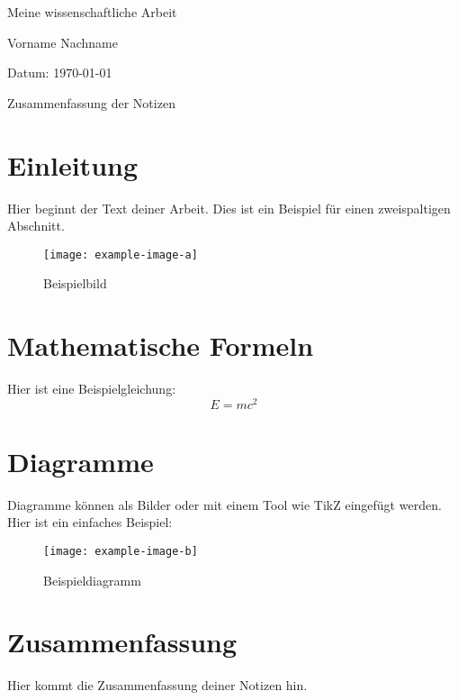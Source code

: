 \documentclass[12pt, a4paper]{article}
\begin{document}
	
	\begin{titlepage}
		\centering
		{\LARGE Meine wissenschaftliche Arbeit}\par
		\vspace{2cm}
		{\Large Vorname Nachname}\par
		\vspace{1cm}
		{\large Datum: \today}\par
		\vspace{3cm}
		\vfill
		{\large Zusammenfassung der Notizen}\par
	\end{titlepage}
	
	\tableofcontents
	\newpage
	
	\begin{multicols}{2}
		
		\section{Einleitung}
		Hier beginnt der Text deiner Arbeit. Dies ist ein Beispiel für einen zweispaltigen Abschnitt.
		
		\begin{figure}[H]
			\centering
			\texttt{[image: example-image-a]}
			\caption{Beispielbild}
			\label{fig:beispiel}
		\end{figure}
		
		\section{Mathematische Formeln}
		Hier ist eine Beispielgleichung:
		\begin{equation}
			E = mc^2
		\end{equation}
		
		\section{Diagramme}
		Diagramme können als Bilder oder mit einem Tool wie TikZ eingefügt werden. Hier ist ein einfaches Beispiel:
		
		\begin{figure}[H]
			\centering
			\texttt{[image: example-image-b]}
			\caption{Beispieldiagramm}
			\label{fig:diagramm}
		\end{figure}
		
		\section{Zusammenfassung}
		Hier kommt die Zusammenfassung deiner Notizen hin.
		
	\end{multicols}
	
\end{document}
